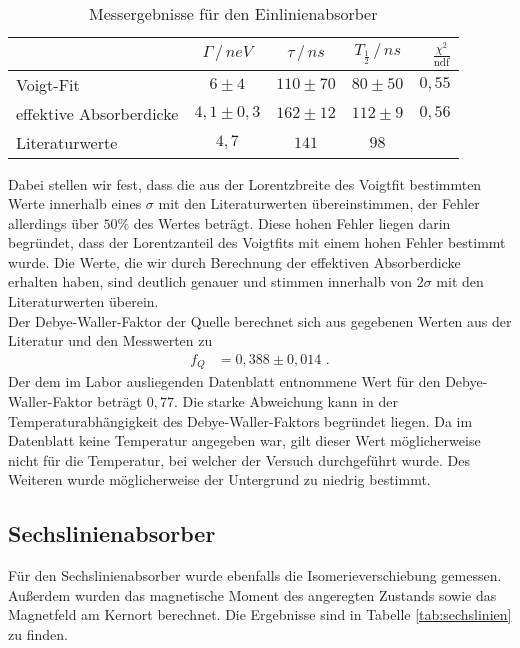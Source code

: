 \begin{table}[h!]
	\centering
	\begin{tabular}{l|ccc|r}
		&$\Gamma\,/\,\si{neV}$&$\tau\,/\,\si{ns}$&$T_{\frac12}\,/\,\si{ns}$&$\frac{\chi^2}{\text{ndf}}$\\\hline
		Voigt-Fit&$6\pm4$&$110\pm70$&$80\pm50$&$0,55$\\
		effektive Absorberdicke&$4,1\pm0,3$&$162\pm12$&$112\pm9$&$0,56$\\
		Literaturwerte \cite{anleitung}&$4,7$&$141$&$98$
	\end{tabular}
	\caption{Messergebnisse für den Einlinienabsorber}
	\label{tab:einlinien}
\end{table}

Dabei stellen wir fest, dass die aus der Lorentzbreite des Voigtfit bestimmten Werte innerhalb eines $\sigma$ mit den Literaturwerten übereinstimmen, der Fehler allerdings über $50\%$ des Wertes beträgt. Diese hohen Fehler liegen darin begründet, dass der Lorentzanteil des Voigtfits mit einem hohen Fehler bestimmt wurde. Die Werte, die wir durch Berechnung der effektiven Absorberdicke erhalten haben, sind deutlich genauer und stimmen innerhalb von $2\sigma$ mit den Literaturwerten überein.\\

Der Debye-Waller-Faktor der Quelle berechnet sich aus gegebenen Werten aus der Literatur und den Messwerten zu 
\begin{align}
	f_Q&=0,388\pm0,014\text{ .}
\end{align}
Der dem im Labor ausliegenden Datenblatt entnommene Wert für den Debye-Waller-Faktor beträgt $0,77$. Die starke Abweichung kann in der Temperaturabhängigkeit des Debye-Waller-Faktors begründet liegen. Da im Datenblatt keine Temperatur angegeben war, gilt dieser Wert möglicherweise nicht für die Temperatur, bei welcher der Versuch durchgeführt wurde. Des Weiteren wurde möglicherweise der Untergrund zu niedrig bestimmt.

\subsection{Sechslinienabsorber}

Für den Sechslinienabsorber wurde ebenfalls die Isomerieverschiebung gemessen. Außerdem wurden das magnetische Moment des angeregten Zustands sowie das Magnetfeld am Kernort berechnet. Die Ergebnisse sind in Tabelle \ref{tab:sechslinien} zu finden.\\

